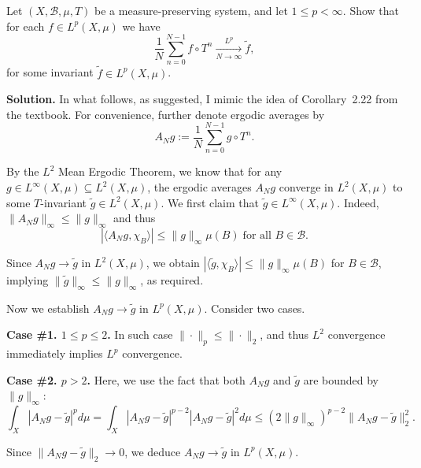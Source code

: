 \documentclass{template}
\begin{document}
\begin{problem}[Exercise 4]
    Let $(X,\mathcal{B},\mu,T)$ be a measure-preserving system, and let $1 \leq p < \infty$.
    Show that for each $f \in L^p(X,\mu)$ we have 
    \begin{equation*}
        \frac{1}{N}\sum_{n=0}^{N-1} f \circ T^n \xrightarrow[N \to \infty]{L^p} \widetilde{f},
    \end{equation*} 
    for some invariant $\widetilde{f} \in L^p(X,\mu)$.
\end{problem}

\textbf{Solution.} In what follows, as suggested, I mimic the idea of
Corollary~2.22 from the textbook. For convenience, further denote ergodic averages by
\begin{equation*}
    A_Ng := \frac{1}{N}\sum_{n=0}^{N-1} g \circ T^n.
\end{equation*}

By the $L^2$ Mean Ergodic Theorem, we know that for any $g \in L^{\infty}(X,\mu)
\subseteq L^2(X,\mu)$, the ergodic averages $A_Ng$ converge in $L^2(X,\mu)$ to
some $T$-invariant $\widetilde{g} \in L^2(X,\mu)$. We first claim that
$\widetilde{g} \in L^{\infty}(X,\mu)$. Indeed, $\|A_Ng\|_{\infty} \leq \|g\|_{\infty}$ and thus
\begin{equation*}
    |\langle A_Ng, \chi_B \rangle| \leq \|g\|_{\infty}\mu(B) \; \text{for all $B \in \mathcal{B}$.}
\end{equation*}

Since $A_Ng \to \widetilde{g}$ in $L^2(X,\mu)$, we obtain $|\langle \widetilde{g}, \chi_B \rangle| \leq \|g\|_{\infty}\mu(B)$ 
for $B \in \mathcal{B}$, implying $\|\widetilde{g}\|_{\infty} \leq \|g\|_{\infty}$, as required.

Now we establish $A_Ng \to \widetilde{g}$ in $L^p(X,\mu)$. Consider two cases.

\textbf{Case \#1. $1 \leq p \leq 2$.} In such case $\|\cdot\|_p \leq \|\cdot\|_2$, and 
thus $L^2$ convergence immediately implies $L^p$ convergence.

\textbf{Case \#2. $p>2$.} Here, we use the fact that both $A_Ng$ and $\widetilde{g}$ are bounded by $\|g\|_{\infty}$:
\begin{equation*}
    \int_X |A_Ng - \widetilde{g}|^pd\mu = \int_X |A_Ng - \widetilde{g}|^{p-2}|A_Ng - \widetilde{g}|^2d\mu \leq (2\|g\|_{\infty})^{p-2}\|A_Ng - \widetilde{g}\|_2^2.
\end{equation*}

Since $\|A_Ng-\widetilde{g}\|_2 \to 0$, we deduce $A_Ng \to \widetilde{g}$ in $L^p(X,\mu)$.
\end{document}
